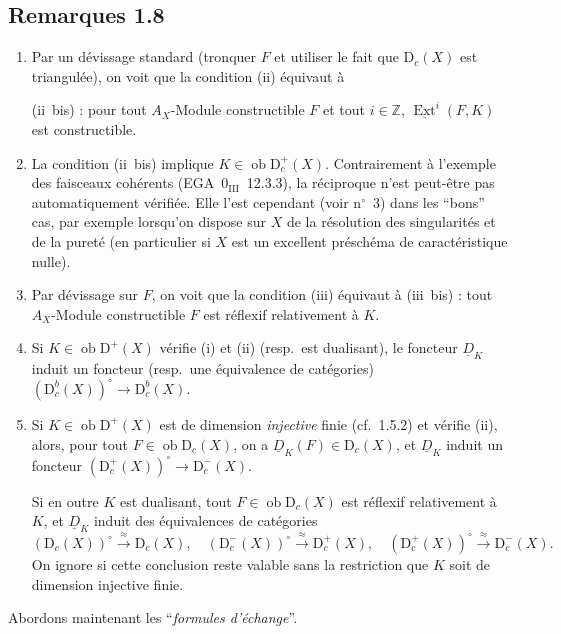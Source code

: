 \documentclass[11pt]{article}
\DeclareMathOperator{\Ext}{Ext}
\newcommand{\D}{\mathrm{D}}
\newcommand{\Z}{\mathbb{Z}}
\newcommand{\ob}{\operatorname{ob}}
\providecommand{\ob}{\operatorname{ob}}
\providecommand{\Z}{\mathbb Z}
\begin{document}
\subsection*{Remarques 1.8}
\begin{enumerate}[label=\alph*)]
\item Par un dévissage standard (tronquer $F$ et utiliser le fait que $\D_c(X)$ est triangulée), on voit que la condition (ii) équivaut à

(ii~bis) : pour tout $A_X$-Module constructible $F$ et tout $i \in \Z$, $\underline{\Ext}^i(F,K)$ est constructible.

\item La condition (ii~bis) implique $K \in \ob \D_c^{+}(X)$. Contrairement à l'exemple des faisceaux cohérents (EGA~$0_{\mathrm{III}}$~12.3.3), la réciproque n'est peut-être pas automatiquement vérifiée. Elle l'est cependant (voir n${}^{\circ}$~3) dans les ``bons'' cas, par exemple lorsqu'on dispose sur $X$ de la résolution des singularités et de la
pureté (en particulier si $X$ est un excellent préschéma de caractéristique nulle).

\item Par dévissage sur $F$, on voit que la condition (iii) équivaut à (iii~bis) : tout $A_X$-Module constructible $F$ est réflexif relativement à $K$.

\item Si $K \in \ob \D^{+}(X)$ vérifie (i) et (ii) (resp.~est dualisant), le foncteur $\underline{D}_K$ induit un foncteur (resp.~une équivalence de catégories) $(\D_c^{b}(X))^{\circ} \to \D_c^{b}(X)$.

\item Si $K \in \ob \D^{+}(X)$ est de dimension \emph{injective} finie (cf.~1.5.2) et vérifie (ii), alors, pour tout $F \in \ob \D_c(X)$, on a $\underline{D}_K(F) \in \D_c(X)$, et $\underline{D}_K$ induit un foncteur $(\D_c^{+}(X))^{\circ} \to \D_c^{-}(X)$.

Si en outre $K$ est dualisant, tout $F \in \ob \D_c(X)$ est réflexif relativement à $K$, et $\underline{D}_K$ induit des équivalences de catégories
\[
(\D_c(X))^{\circ} \xrightarrow{\approx} \D_c(X), \quad (\D_c^{-}(X))^{\circ} \xrightarrow{\approx} \D_c^{+}(X), \quad (\D_c^{+}(X))^{\circ} \xrightarrow{\approx} \D_c^{-}(X).
\]
On ignore si cette conclusion reste valable sans la restriction que $K$ soit de dimension injective finie.
\end{enumerate}

Abordons maintenant les ``\emph{formules d'échange}''.
\end{document}
